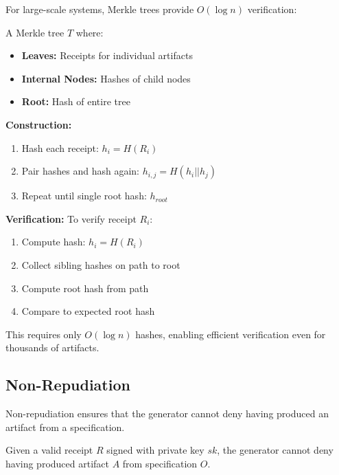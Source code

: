 For large-scale systems, Merkle trees provide \(O(\log n)\) verification:

\begin{definition}
    A Merkle tree \(T\) where:
    \begin{itemize}
        \item \textbf{Leaves:} Receipts for individual artifacts
        \item \textbf{Internal Nodes:} Hashes of child nodes
        \item \textbf{Root:} Hash of entire tree
    \end{itemize}
\end{definition}

\textbf{Construction:}
\begin{enumerate}
    \item Hash each receipt: \(h_i = H(R_i)\)
    \item Pair hashes and hash again: \(h_{i,j} = H(h_i || h_j)\)
    \item Repeat until single root hash: \(h_{root}\)
\end{enumerate}

\textbf{Verification:} To verify receipt \(R_i\):
\begin{enumerate}
    \item Compute hash: \(h_i = H(R_i)\)
    \item Collect sibling hashes on path to root
    \item Compute root hash from path
    \item Compare to expected root hash
\end{enumerate}

This requires only \(O(\log n)\) hashes, enabling efficient verification even for thousands of artifacts.

\subsection{Non-Repudiation}

Non-repudiation ensures that the generator cannot deny having produced an artifact from a specification.

\begin{theorem}
    Given a valid receipt \(R\) signed with private key \(sk\), the generator cannot deny having produced artifact \(A\) from specification \(O\).
\end{theorem}

